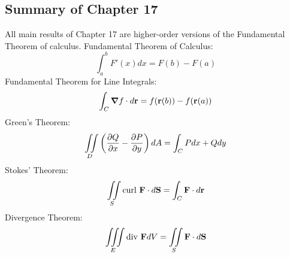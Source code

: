 \documentclass{article}
\begin{document}
    \subsection{Summary of Chapter 17}
    \begin{outline}
        \1 All main results of Chapter 17 are higher-order versions of the Fundamental Theorem of calculus. 
        \1 Fundamental Theorem of Calculus: \[\int^b_aF'(x)dx=F(b)-F(a)\]
        \1 Fundamental Theorem for Line Integrals: \[\int_C\grad f\cdot d\vb r=f(\vb r(b)) - f(\vb r(a))\]
        \1 Green's Theorem: \[\iint\limits_D\left(\pdv{Q}{x}-\pdv{P}{y}\right)dA=\int_CPdx+Qdy\]
        \1 Stokes' Theorem: \[\iint\limits_S\text{curl }\vb F\cdot d\vb S=\int_C\vb F\cdot d\vb r\]
        \1 Divergence Theorem: \[\iiint\limits_E\text{div }\vb FdV=\iint\limits_S\vb F\cdot d\vb S\]
    \end{outline}
\end{document}
